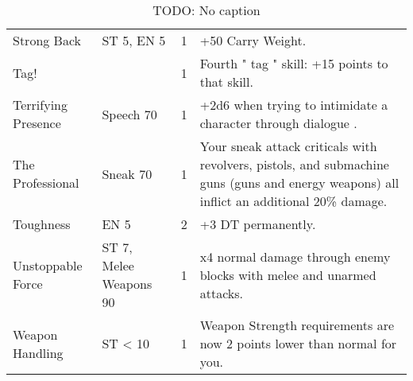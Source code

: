 \documentclass{report}
\begin{document}
\begin{table}[H]
\begin{tabular}{p{30mm}p{30mm}p{30mm}p{30mm}}
Strong Back  & ST 5, EN 5  & 1  & +50 Carry Weight.  \\
Tag!  &  & 1  & Fourth  " tag "  skill: +15 points to that skill.  \\
Terrifying Presence  & Speech 70  & 1  & +2d6 when trying to intimidate a character through dialogue .  \\
The Professional  & Sneak 70  & 1  & Your sneak attack criticals with revolvers, pistols, and submachine guns (guns and energy weapons) all inflict an additional 20\% damage.  \\
Toughness  & EN 5  & 2  & +3 DT permanently.  \\
Unstoppable Force  & ST 7, Melee Weapons 90  & 1  & x4 normal damage through enemy blocks with melee and unarmed attacks.  \\
Weapon Handling  & ST  <  10  & 1  & Weapon Strength requirements are now 2 points lower than normal for you.  \\
  \end{tabular}
  \caption{TODO: No caption}
  \label{tab:2}
\end{table}
\end{document}
